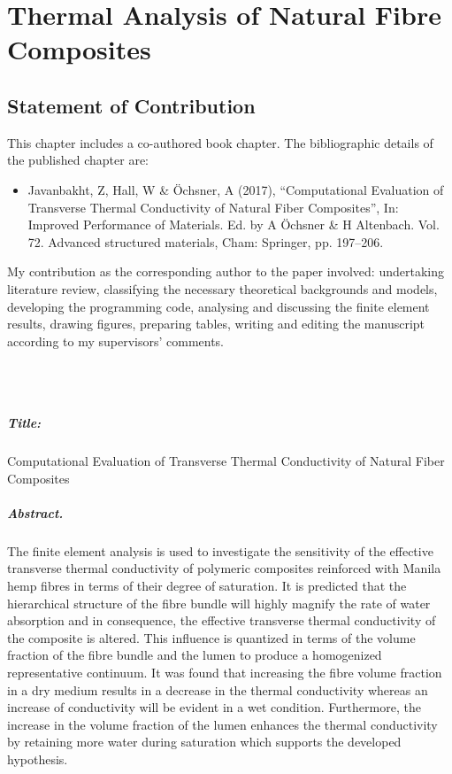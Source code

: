 
\chapter{Thermal Analysis of Natural Fibre Composites}\label{chap:p3}

\section*{Statement of Contribution}
	This chapter includes a co-authored book chapter. The bibliographic details of the published chapter are:
\begin{itemize}
	\item Javanbakht, Z, Hall, W \& Öchsner, A (2017), “Computational Evaluation of Transverse Thermal Conductivity of Natural Fiber Composites”, In: Improved Performance of Materials. Ed. by A Öchsner \& H Altenbach. Vol. 72. Advanced structured materials, Cham: Springer, pp. 197–206.
\end{itemize}
	My contribution as the corresponding author to the paper involved: undertaking literature review, classifying the necessary theoretical backgrounds and models, developing the programming code, analysing and discussing the finite element results, drawing figures, preparing tables, writing and editing the manuscript according to my supervisors’ comments.
	
\vspace{-0.5cm}
\Zia\\
\Wayne\\
\vfill
\newpage


\paragraph{Title:} Computational Evaluation of Transverse Thermal Conductivity of Natural Fiber Composites


\paragraph{Abstract.}The finite element analysis is used to investigate the sensitivity of the effective transverse thermal conductivity of polymeric composites reinforced with Manila hemp fibres in terms of their degree of saturation. It is predicted that the hierarchical structure of the fibre bundle will highly magnify the rate of water absorption and in consequence, the effective transverse thermal conductivity of the composite is altered. This influence is quantized in terms of the volume fraction of the fibre bundle and the lumen to produce a homogenized representative continuum. It was found that increasing the fibre volume fraction in a dry medium results in a decrease in the thermal conductivity whereas an increase of conductivity will be evident in a wet condition. Furthermore, the increase in the volume fraction of the lumen enhances the thermal conductivity by retaining more water during saturation which supports the developed hypothesis.

